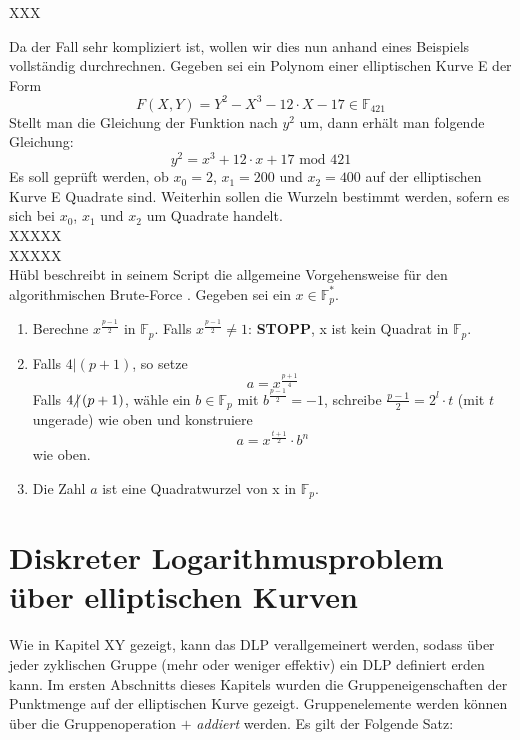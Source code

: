 XXX








Da der Fall sehr kompliziert ist, wollen wir dies nun anhand eines Beispiels vollständig durchrechnen. Gegeben sei ein Polynom einer elliptischen Kurve E der Form $$F(X, Y) = Y^{2} - X^{3} - 12 \cdot X - 17 \in \mathbb{F}_{421}$$ Stellt man die Gleichung der Funktion nach $y^{2}$ um, dann erhält man folgende Gleichung: $$y^{2} =  x^{3} + 12 \cdot x + 17 \text{ mod }421$$ Es soll geprüft werden, ob $x_0 = 2$, $x_1 = 200$ und $x_2 = 400$ auf der elliptischen Kurve E Quadrate sind. Weiterhin sollen die Wurzeln bestimmt werden, sofern es sich bei $x_0$, $x_1$ und $x_2$ um Quadrate handelt.\\

XXXXX\\

XXXXX\\





Hübl beschreibt in seinem Script die allgemeine Vorgehensweise für den algorithmischen Brute-Force \cite[S. 270-272]{Dr.ReinholdHubl.2022}. Gegeben sei ein $x \in \mathbb{F}_p^*$.

\begin{enumerate}
\item Berechne $x^{\frac{p - 1}{2}}$ in $\mathbb{F}_p$. Falls $x^{\frac{p - 1}{2}} \neq 1$: \textbf{STOPP}, x ist kein Quadrat in $\mathbb{F}_p$.
\item Falls $4 | (p + 1)$, so setze $$a =  x^{\frac{p + 1}{4}}$$ Falls $4 \hspace{-0.4em}\not\hspace{0.025em}|\, (p + 1)$, wähle ein $b \in \mathbb{F}_p$ mit $b^{\frac{p - 1}{2}} = -1$, schreibe $\frac{p - 1}{2} = 2^l \cdot t$ (mit $t$ ungerade) wie oben und konstruiere $$a =  x^{\frac{t + 1}{2}} \cdot b^n$$ wie oben.
\item Die Zahl $a$ ist eine Quadratwurzel von x in $\mathbb{F}_p$.
\end{enumerate}


\section{Diskreter Logarithmusproblem über elliptischen Kurven} \label{sec:DLPüberEC}
Wie in Kapitel XY gezeigt, kann das DLP verallgemeinert werden, sodass über jeder zyklischen Gruppe (mehr oder weniger effektiv) ein DLP definiert erden kann. Im ersten Abschnitts dieses Kapitels wurden die Gruppeneigenschaften der Punktmenge auf der elliptischen Kurve gezeigt. Gruppenelemente werden können über die Gruppenoperation $+$ \textit{addiert} werden. Es gilt der Folgende Satz:

